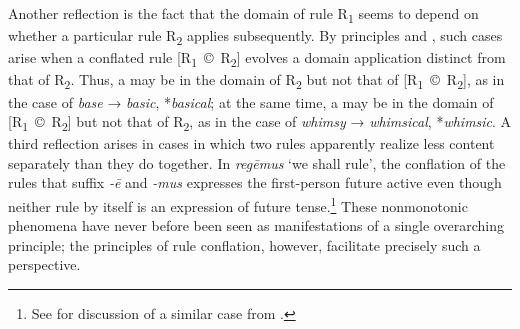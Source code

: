 \documentclass[output=paper,
modfonts
]{LSP/langsci}
\begin{document}
Another reflection is the fact that the domain of rule R\textsubscript{1} seems to depend on whether a particular rule R\textsubscript{2} applies subsequently.  By principles  and , such cases arise when a conflated rule [R\textsubscript{1}~©~R\textsubscript{2}] evolves a domain application distinct from that of R\textsubscript{2}.  Thus, a  may be in the domain of R\textsubscript{2} but not that of [R\textsubscript{1}~©~R\textsubscript{2}], as in the case of \textit{base} → \textit{basic}, *\textit{basical}; at the same time, a  may be in the domain of [R\textsubscript{1}~©~R\textsubscript{2}] but not that of R\textsubscript{2}, as in the case of \textit{whimsy} → \textit{whimsical}, *\textit{whimsic}.  A third reflection arises in cases in which two rules apparently realize less content separately than they do together. In  \textit{reg\=emus} ‘we shall rule’, the conflation of the rules that suffix \textit{\nobreakdash-\=e} and \textit{\nobreakdash-mus} expresses the first\nobreakdash-person  future active even though neither rule by itself is an expression of future tense.\footnote{See \citet{stump-b} for discussion of a similar case from .}  These nonmonotonic phenomena have never before been seen as manifestations of a single overarching principle; the principles of rule conflation, however, facilitate precisely such a perspective.
\end{document}

